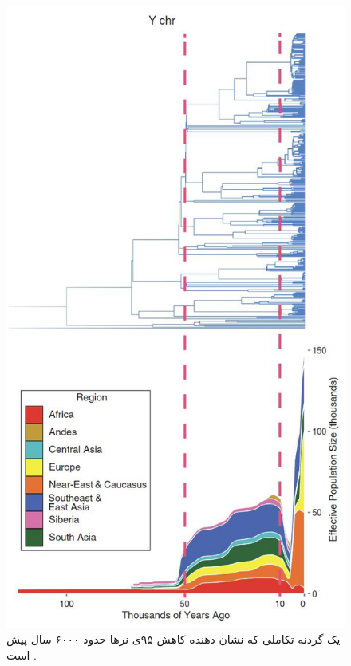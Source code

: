 \documentclass[10pt,twocolumn,letterpaper]{article}
\begin{document}
\begin{figure}[b]
\begin{center}
   \includegraphics[width=1\linewidth]{bottleneck.jpg}
\end{center}
   \caption{یک گردنه تکاملی که نشان دهنده کاهش ۹۵\٪ی نرها حدود ۶۰۰۰ سال پیش است \cite{62}.}
\label{fig:10}
\label{fig:onecol}
\end{figure}
\end{document}
